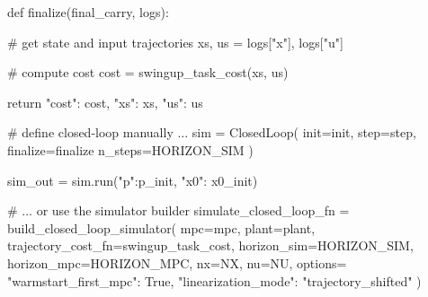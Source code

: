 \documentclass[DIV=10]{scrartcl}
\begin{document}
\newpage

\begin{Piton}[tcolorbox]

def finalize(final_carry, logs):
    
    # get state and input trajectories
    xs, us = logs["x"], logs["u"]

    # compute cost
    cost = swingup_task_cost(xs, us)

    return {"cost": cost, "xs": xs, "us": us}

# define closed-loop manually ...
sim = ClosedLoop(
    init=init, 
    step=step,
    finalize=finalize
    n_steps=HORIZON_SIM
)

sim_out = sim.run({"p":p_init, "x0": x0_init})

# ... or use the simulator builder
simulate_closed_loop_fn = build_closed_loop_simulator(
    mpc=mpc,
    plant=plant,
    trajectory_cost_fn=swingup_task_cost,
    horizon_sim=HORIZON_SIM,
    horizon_mpc=HORIZON_MPC,
    nx=NX,
    nu=NU,
    options={
        "warmstart_first_mpc": True, 
        "linearization_mode": "trajectory_shifted"
    }
)


\end{Piton}
\end{document}
